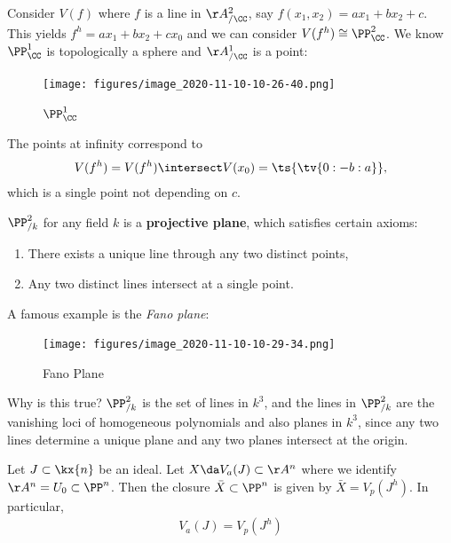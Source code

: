 \begin{example}[?]

Consider \(V(f)\) where \(f\) is a line in \(\AA^2_{/\CC}\), say
\(f(x_1, x_2) = ax_1 + bx_2 + c\). This yields
\(f^h = ax_1 + bx_2 + cx_0\) and we can consider
\(V(f^h) \cong \PP^2_{\CC}\). We know \(\PP^1_{\CC}\) is topologically a
sphere and \(\AA^1_{/\CC}\) is a point:

\begin{figure}
\centering
\texttt{[image: figures/image\_2020-11-10-10-26-40.png]}
\caption{\(\PP^1_{\CC}\)}
\end{figure}

The points at infinity correspond to
\begin{align*}  
V(f^h) = V(f^h) \intersect V(x_0) = \ts{\tv{0:-b:a}}
,\end{align*} which is a single point not depending on \(c\).

\end{example}

\begin{remark}

\(\PP^2_{/k}\) for any field \(k\) is a \textbf{projective plane}, which
satisfies certain axioms:

\begin{enumerate}
\def\labelenumi{\arabic{enumi}.}
\item
  There exists a unique line through any two distinct points,
\item
  Any two distinct lines intersect at a single point.
\end{enumerate}

A famous example is the \emph{Fano plane}:

\begin{figure}
\centering
\texttt{[image: figures/image\_2020-11-10-10-29-34.png]}
\caption{Fano Plane}
\end{figure}

Why is this true? \(\PP^2_{/k}\) is the set of lines in \(k^3\), and the
lines in \(\PP^2_{/k}\) are the vanishing loci of homogeneous
polynomials and also planes in \(k^3\), since any two lines determine a
unique plane and any two planes intersect at the origin.

\end{remark}

\begin{proposition}[?]

Let \(J\subset \kx{n}\) be an ideal. Let \(X \da V_a(J) \subset \AA^n\)
where we identify \(\AA^n = U_0 \subset \PP^n\). Then the closure
\(\bar{X} \subset \PP^n\) is given by \(\bar{X} = V_p(J^h)\). In
particular,
\begin{align*}
V_a(J) = V_p(J^h)
\end{align*}

\end{proposition}

